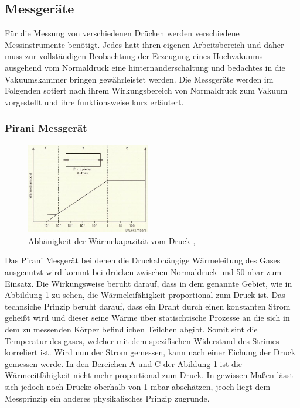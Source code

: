 \subsection{Messgeräte}
Für die Messung von verschiedenen Drücken werden verschiedene Messinstrumente benötigt. Jedes hatt ihren eigenen Arbeitsbereich und daher muss zur vollständigen Beobachtung der Erzeugung eines Hochvakuums ausgehend vom Normaldruck eine hinternanderschaltung und bedachtes in die Vakuumskammer bringen gewährleistet werden. Die Messgeräte werden im Folgenden sotiert nach ihrem Wirkungsbereich von Normaldruck zum Vakuum vorgestellt und ihre funktionsweise kurz erläutert.

\subsubsection{Pirani Messgerät}
\begin{figure}
  \centering
  \includegraphics[width=0.48\textwidth]{picture/Pirani.JPG}
  \caption{Abhänigkeit der Wärmekapazität vom Druck \cite{Dreh}, \cite{Jena}}
  \label{fig:pirani}
  \vspace{-0.6cm}
\end{figure}
Das Pirani Mesgerät bei denen die Druckabhängige Wärmeleitung des Gases ausgenutzt wird kommt bei drücken zwischen Normaldruck und 50 nbar zum Einsatz. Die Wirkungsweise beruht darauf, dass in dem genannte Gebiet, wie in Abbildung \ref{fig:pirani} zu sehen, die Wärmeleifähigkeit proportional zum Druck ist. Das technsiche Prinzip beruht darauf, dass ein Draht durch einen konstanten Strom geheißt wird und dieser seine Wärme über statischtische Prozesse an die sich in dem zu messenden Körper befindlichen Teilchen abgibt. Somit sint die Temperatur des gases, welcher mit dem spezifischen Widerstand des Strimes korreliert ist. Wird nun der Strom gemessen, kann nach einer Eichung der Druck gemessen werde. In den Bereichen A und C der Abildung \ref{fig:pirani} ist die Wärmeeitfähigkeit nicht mehr proportional zum Druck. In gewissen Maßen lässt sich jedoch noch Drücke oberhalb von 1 mbar abschätzen, jeoch liegt dem Messprinzip ein anderes physikalisches Prinzip zugrunde.


